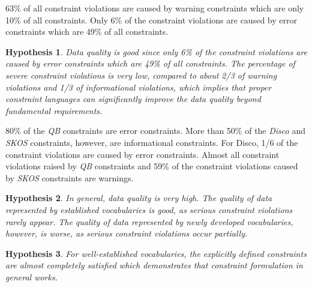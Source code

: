 \documentclass{llncs}
\newtheorem{hyp}{Hypothesis}
\begin{document}
{{63\% of all constraint violations are caused by warning constraints which are only 10\% of all constraints. 
Only 6\% of the constraint violations are caused by error constraints which are 49\% of all constraints.

\begin{hyp}
Data quality is good since only 6\% of the constraint violations are caused by error constraints which are 49\% of all constraints.
The percentage of severe constraint violations is very low, compared to about 2/3 of warning violations and 1/3 of informational violations, which implies that proper constraint languages can significantly improve the data quality beyond fundamental requirements.
\end{hyp} 

80\% of the \emph{QB} constraints are error constraints.
More than 50\% of the \emph{Disco} and \emph{SKOS} constraints, however, are informational constraints.
For Disco, 1/6 of the constraint violations are caused by error constraints.
Almost all constraint violations raised by \emph{QB} constraints and 59\% of the constraint violations caused by \emph{SKOS} constraints are warnings.  
\begin{hyp}
In general, data quality is very high.
The quality of data represented by established vocabularies is good,
as serious constraint violations rarely appear.
The quality of data represented by newly developed vocabularies, however, is worse,
as serious constraint violations occur partially.
\end{hyp} 

\begin{hyp}
For well-established vocabularies, the explicitly defined constraints are almost completely satisfied which demonstrates that constraint formulation in general works.
\end{hyp}


}}
\end{document}
